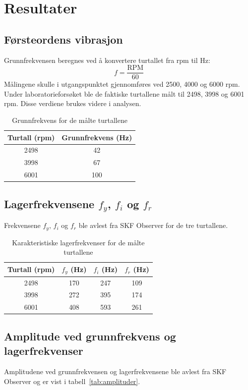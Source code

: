 \section{Resultater}

\subsection*{Førsteordens vibrasjon}
Grunnfrekvensen beregnes ved å konvertere turtallet fra rpm til Hz:
\[
f = \frac{\mathrm{RPM}}{60}
\]
Målingene skulle i utgangspunktet gjennomføres ved 2500, 4000 og 6000 rpm. Under laboratorieforsøket ble de faktiske turtallene målt til 2498, 3998 og 6001 rpm. Disse verdiene brukes videre i analysen.

\renewcommand{\arraystretch}{1.3}
\begin{table}[h]
\centering
\begin{tabular}{|c|c|}
\hline
Turtall (rpm) & Grunnfrekvens (Hz) \\
\hline
2498 & 42 \\
\hline
3998 & 67 \\
\hline
6001 & 100 \\
\hline
\end{tabular}
\caption{Grunnfrekvens for de målte turtallene}
\end{table}

\subsection*{Lagerfrekvensene $f_y$, $f_i$ og $f_r$}
Frekvensene $f_y$, $f_i$ og $f_r$ ble avlest fra SKF Observer for de tre turtallene.

\begin{table}[h]
\centering
\begin{tabular}{|c|c|c|c|}
\hline
Turtall (rpm) & $f_y$ (Hz) & $f_i$ (Hz) & $f_r$ (Hz) \\
\hline
2498 & 170 & 247 & 109 \\
\hline
3998 & 272 & 395 & 174 \\
\hline
6001 & 408 & 593 & 261 \\
\hline
\end{tabular}
\caption{Karakteristiske lagerfrekvenser for de målte turtallene}
\end{table}

\subsection*{Amplitude ved grunnfrekvens og lagerfrekvenser}
Amplitudene ved grunnfrekvensen og lagerfrekvensene ble avlest fra SKF Observer og er vist i tabell~\ref{tab:amplituder}.

